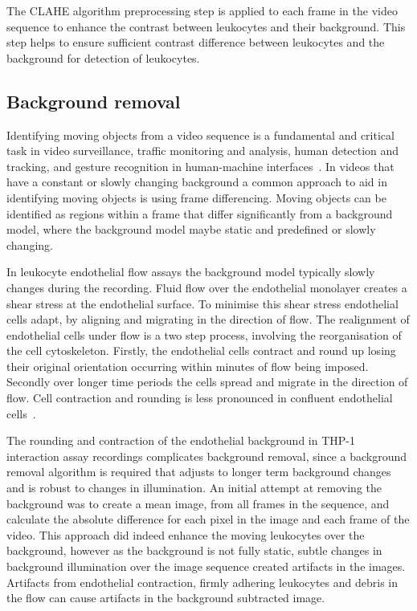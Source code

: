 The CLAHE algorithm preprocessing step is applied to each frame in the video sequence to enhance the contrast between leukocytes and their background. This step helps to ensure sufficient contrast difference between leukocytes and the background for detection of leukocytes.

\subsection{Background removal}
\label{leukocytes:processing:background}
Identifying moving objects from a video sequence is a fundamental and critical task in video surveillance, traffic monitoring and analysis, human detection and tracking, and gesture recognition in human-machine interfaces~\cite{Cheung2004}. In videos that have a constant or slowly changing background a common approach to aid in identifying moving objects is using frame differencing. Moving objects can be identified as regions within a frame that differ significantly from a background model, where the background model maybe static and predefined or slowly changing.

In leukocyte endothelial flow assays the background model typically slowly changes during the recording. Fluid flow over the endothelial monolayer creates a shear stress at the endothelial surface. To minimise this shear stress endothelial cells adapt, by aligning and migrating in the direction of flow. The realignment of endothelial cells under flow is a two step process, involving the reorganisation of the cell cytoskeleton. Firstly, the endothelial cells contract and round up losing their original orientation occurring within minutes of flow being imposed. Secondly over longer time periods the cells spread and migrate in the direction of flow. Cell contraction and rounding is less pronounced in confluent endothelial cells~\cite{Wells2011}.

The rounding and contraction of the endothelial background in THP-1 interaction assay recordings complicates background removal, since a background removal algorithm is required that adjusts to longer term background changes and is robust to changes in illumination. An initial attempt at removing the background was to create a mean image, from all frames in the sequence, and calculate the absolute difference for each pixel in the image and each frame of the video. This approach did indeed enhance the moving leukocytes over the background, however as the background is not fully static, subtle changes in background illumination over the image sequence created artifacts in the images. Artifacts from endothelial contraction, firmly adhering leukocytes and debris in the flow can cause artifacts in the background subtracted image.

